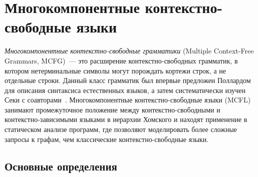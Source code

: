 \setchapterpreamble[u]{\margintoc}
\chapter{Многокомпонентные контекстно-свободные языки}
\label{MCFG}

%

\emph{Многокомпонентные контекстно-свободные грамматики} (Multiple Context-Free Grammars, MCFG)~--- это расширение контекстно-свободных грамматик, в котором нетерминальные символы могут порождать кортежи строк, а не отдельные строки.
Данный класс грамматик был впервые предложен Поллардом~ для описания синтаксиса естественных языков, а затем систематически изучен Секи с соавторами~.
Многокомпонентные контекстно-свободные языки (MCFL) занимают промежуточное положение между контекстно-свободными и контекстно-зависимыми языками в иерархии Хомского и находят применение в статическом анализе программ, где позволяют моделировать более сложные запросы к графам, чем классические контекстно-свободные языки.

\section{Основные определения}

